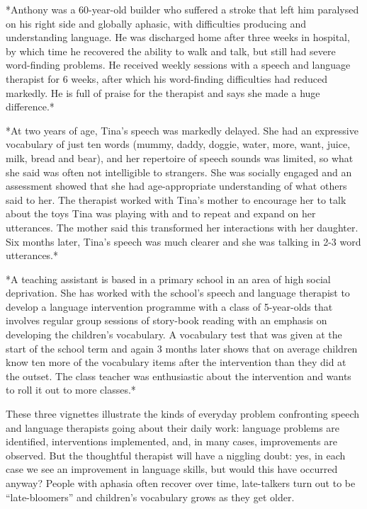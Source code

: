 \documentclass{krantz}
\begin{document}
\begin{shaded}
*Anthony was a 60-year-old builder who suffered a stroke that left him paralysed on his right side and globally aphasic, with difficulties producing and understanding language. He was discharged home after three weeks in hospital, by which time he recovered the ability to walk and talk, but still had severe word-finding problems. He received weekly sessions with a speech and language therapist for 6 weeks, after which his word-finding difficulties had reduced markedly. He is full of praise for the therapist and says she made a huge difference.*
\end{shaded}
\begin{shaded}
*At two years of age, Tina's speech was markedly delayed. She had an expressive vocabulary of just ten words (mummy, daddy, doggie, water, more, want, juice, milk, bread and bear), and her repertoire of speech sounds was limited, so what she said was often not intelligible to strangers. She was socially engaged and an assessment showed that she had age-appropriate understanding of what others said to her. The therapist worked with Tina's mother to encourage her to talk about the toys Tina was playing with and to repeat and expand on her utterances. The mother said this transformed her interactions with her daughter. Six months later, Tina's speech was much clearer and she was talking in 2-3 word utterances.*
\end{shaded}
\begin{shaded}
*A teaching assistant is based in a primary school in an area of high social deprivation. She has worked with the school's speech and language therapist to develop a language intervention programme with a class of 5-year-olds that involves regular group sessions of story-book reading with an emphasis on developing the children's vocabulary. A vocabulary test that was given at the start of the school term and again 3 months later shows that on average children know ten more of the vocabulary items after the intervention than they did at the outset. The class teacher was enthusiastic about the intervention and wants to roll it out to more classes.*
\end{shaded}

These three vignettes illustrate the kinds of everyday problem confronting speech and language therapists going about their daily work: language problems are identified, interventions implemented, and, in many cases, improvements are observed. But the thoughtful therapist will have a niggling doubt: yes, in each case we see an improvement in language skills, but would this have occurred anyway? People with aphasia often recover over time, late-talkers turn out to be ``late-bloomers'' and children's vocabulary grows as they get older.
\end{document}
